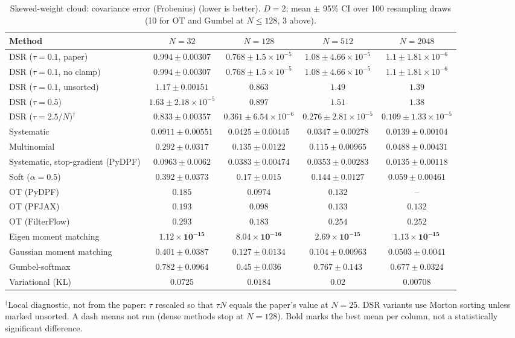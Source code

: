 \begin{table}[H]
\centering
\small
\caption{Skewed-weight cloud: covariance error (Frobenius) (lower is better). $D{=}2$; mean $\pm$ 95\% CI over 100 resampling draws (10 for OT and Gumbel at $N\le128$, 3 above).}
\label{tab:static-skewed-covariance_error}
\begin{adjustbox}{max width=\linewidth}
\begin{tabular}{lcccc}
\toprule
Method & $N{=}32$ & $N{=}128$ & $N{=}512$ & $N{=}2048$ \\
\midrule
DSR ($\tau{=}0.1$, paper) & $0.994\pm0.00307$ & $0.768\pm1.5\times10^{-5}$ & $1.08\pm4.66\times10^{-5}$ & $1.1\pm1.81\times10^{-6}$ \\
DSR ($\tau{=}0.1$, no clamp) & $0.994\pm0.00307$ & $0.768\pm1.5\times10^{-5}$ & $1.08\pm4.66\times10^{-5}$ & $1.1\pm1.81\times10^{-6}$ \\
DSR ($\tau{=}0.1$, unsorted) & $1.17\pm0.00151$ & $0.863$ & $1.49$ & $1.39$ \\
DSR ($\tau{=}0.5$) & $1.63\pm2.18\times10^{-5}$ & $0.897$ & $1.51$ & $1.38$ \\
DSR ($\tau{=}2.5/N$)$^\dagger$ & $0.833\pm0.00357$ & $0.361\pm6.54\times10^{-6}$ & $0.276\pm2.81\times10^{-5}$ & $0.109\pm1.33\times10^{-5}$ \\
\midrule
Systematic & $0.0911\pm0.00551$ & $0.0425\pm0.00445$ & $0.0347\pm0.00278$ & $0.0139\pm0.00104$ \\
Multinomial & $0.292\pm0.0317$ & $0.135\pm0.0122$ & $0.115\pm0.00965$ & $0.0488\pm0.00431$ \\
Systematic, stop-gradient (PyDPF) & $0.0963\pm0.0062$ & $0.0383\pm0.00474$ & $0.0353\pm0.00283$ & $0.0135\pm0.00118$ \\
Soft ($\alpha{=}0.5$) & $0.392\pm0.0373$ & $0.17\pm0.015$ & $0.144\pm0.0127$ & $0.059\pm0.00461$ \\
OT (PyDPF) & $0.185$ & $0.0974$ & $0.132$ & -- \\
OT (PFJAX) & $0.193$ & $0.098$ & $0.133$ & $0.132$ \\
OT (FilterFlow) & $0.293$ & $0.183$ & $0.254$ & $0.252$ \\
Eigen moment matching & $\mathbf{1.12\times10^{-15}}$ & $\mathbf{8.04\times10^{-16}}$ & $\mathbf{2.69\times10^{-15}}$ & $\mathbf{1.13\times10^{-15}}$ \\
Gaussian moment matching & $0.401\pm0.0387$ & $0.127\pm0.0134$ & $0.104\pm0.00963$ & $0.0503\pm0.0041$ \\
Gumbel-softmax & $0.782\pm0.0964$ & $0.45\pm0.036$ & $0.767\pm0.143$ & $0.677\pm0.0324$ \\
Variational (KL) & $0.0725$ & $0.0184$ & $0.02$ & $0.00708$ \\
\bottomrule
\end{tabular}
\end{adjustbox}
\par\smallskip\parbox{0.95\linewidth}{\footnotesize $^\dagger$Local diagnostic, not from the paper: $\tau$ rescaled so that $\tau N$ equals the paper's value at $N{=}25$. DSR variants use Morton sorting unless marked unsorted. A dash means not run (dense methods stop at $N{=}128$). Bold marks the best mean per column, not a statistically significant difference.}
\end{table}

